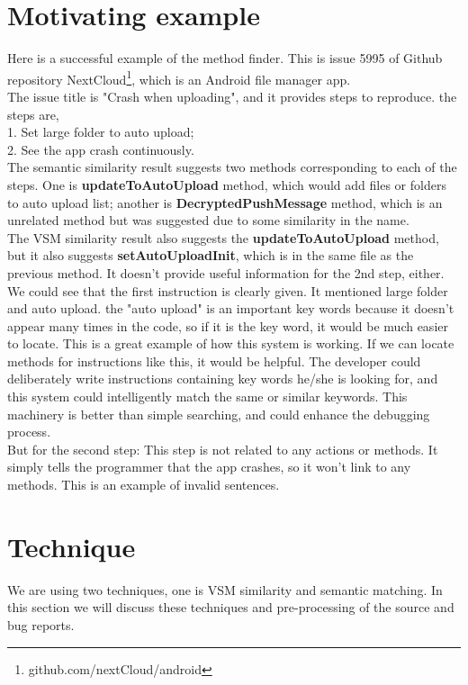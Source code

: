 \documentclass[sigconf]{acmart}
\begin{document}
\section{Motivating example}
Here is a successful example of the method finder. This is issue 5995 of Github repository NextCloud\footnote{github.com/nextCloud/android}, which is an Android file manager app.\\
The issue title is "Crash when uploading", and it provides steps to reproduce. the steps are,\\
1. Set large folder to auto upload;\\
2. See the app crash continuously.\\
The semantic similarity result suggests two methods corresponding to each of the steps. One is \textbf{updateToAutoUpload} method, which would add files or folders to auto upload list; another is \textbf{DecryptedPushMessage} method, which is an unrelated method but was suggested due to some similarity in the name.\\
The VSM similarity result also suggests the \textbf{updateToAutoUpload} method, but it also suggests \textbf{setAutoUploadInit}, which is in the same file as the previous method. It doesn't provide useful information for the 2nd step, either.\\
We could see that the first instruction is clearly given. It mentioned large folder and auto upload. the "auto upload" is an important key words because it doesn't appear many times in the code, so if it is the key word, it would be much easier to locate. This is a great example of how this system is working. If we can locate methods for instructions like this, it would be helpful. The developer could deliberately write instructions containing key words he/she is looking for, and this system could intelligently match the same or similar keywords. This machinery is better than simple searching, and could enhance the debugging process.\\
But for the second step: This step is not related to any actions or methods. It simply tells the programmer that the app crashes, so it won't link to any methods. This is an example of invalid sentences.\\

\section{Technique}
\label{section:technique}
We are using two techniques, one is VSM similarity and semantic matching. In this section we will discuss these techniques and pre-processing of the source and bug reports.
\end{document}
